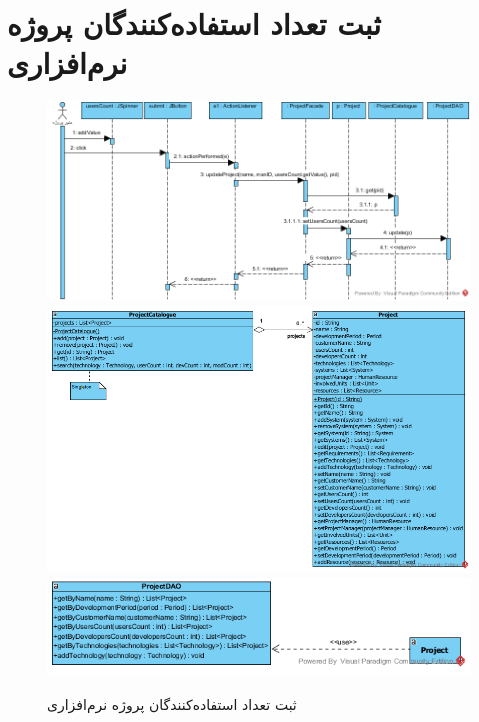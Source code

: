\section{ثبت تعداد استفاده‌کنندگان پروژه نرم‌افزاری}
\begin{figure}[H]
	\centering
	\includegraphics[scale=0.6]{img/sequence-design/AddUsersCount}
	\includegraphics[scale=0.6]{img/sequence-design/AddUsersCountC}
	\includegraphics[scale=0.6]{img/sequence-design/AddUsersCountD}
	\caption{ثبت تعداد استفاده‌کنندگان پروژه نرم‌افزاری}
\end{figure}


